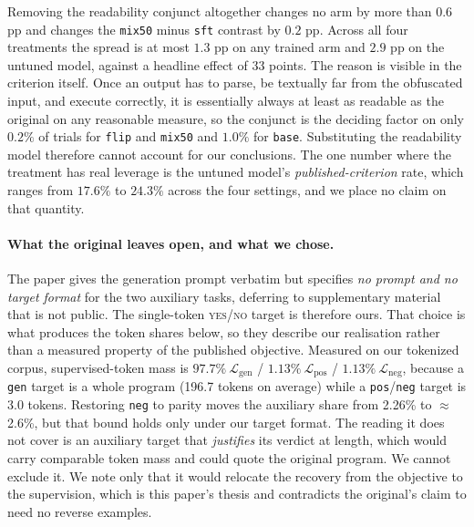 \documentclass{article}
\newcommand{\arm}[1]{\texttt{#1}}
\begin{document}
Removing the readability conjunct altogether changes no arm by more than $0.6$ pp and changes
the \arm{mix50} minus \arm{sft} contrast by $0.2$ pp. Across all four treatments the spread is
at most $1.3$ pp on any trained arm and $2.9$ pp on the untuned model, against a headline
effect of 33 points. The reason is visible in the criterion itself. Once an output has to
parse, be textually far from the obfuscated input, and execute correctly, it is essentially
always at least as readable as the original on any reasonable measure, so the conjunct is the
deciding factor on only $0.2\%$ of trials for \arm{flip} and \arm{mix50} and $1.0\%$ for
\arm{base}. Substituting the readability model therefore cannot account for our conclusions.
The one number where the treatment has real leverage is the untuned model's
\emph{published-criterion} rate, which ranges from $17.6\%$ to $24.3\%$ across the four
settings, and we place no claim on that quantity.

\paragraph{What the original leaves open, and what we chose.} The paper gives the
generation prompt verbatim but specifies \emph{no prompt and no target format} for the two
auxiliary tasks, deferring to supplementary material that is not public. The single-token
\textsc{yes}/\textsc{no} target is therefore ours. That choice is what produces the token
shares below, so they describe our realisation rather than a measured property of the
published objective. Measured on our tokenized corpus, supervised-token mass is
$97.7\%\ \mathcal{L}_{\mathrm{gen}}$ / $1.13\%\ \mathcal{L}_{\mathrm{pos}}$ /
$1.13\%\ \mathcal{L}_{\mathrm{neg}}$, because a \arm{gen} target is a whole program (196.7
tokens on average) while a \arm{pos}/\arm{neg} target is 3.0 tokens. Restoring \arm{neg} to
parity moves the auxiliary share from 2.26\% to $\approx$2.6\%, but that bound holds only
under our target format. The reading it does not cover is an auxiliary target that
\emph{justifies} its verdict at length, which would carry comparable token mass and could
quote the original program. We cannot exclude it. We note only that it would relocate the
recovery from the objective to the supervision, which is this paper's thesis and contradicts
the original's claim to need no reverse examples.
\end{document}

